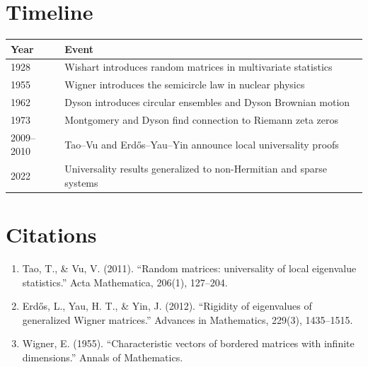 \section{Timeline}

\begin{tabularx}{\linewidth}{lX}
\toprule
\textbf{Year} & \textbf{Event} \\ \midrule
1928 & Wishart introduces random matrices in multivariate statistics \\ 
1955 & Wigner introduces the semicircle law in nuclear physics \\ 
1962 & Dyson introduces circular ensembles and Dyson Brownian motion \\ 
1973 & Montgomery and Dyson find connection to Riemann zeta zeros \\ 
2009--2010 & Tao--Vu and Erdős--Yau--Yin announce local universality proofs \cite{taovu2011, erdos2012} \\ 
2022 & Universality results generalized to non-Hermitian and sparse systems \\ \bottomrule
\end{tabularx}

\section{Citations}

\begin{enumerate}
\item Tao, T., \& Vu, V. (2011). ``Random matrices: universality of local eigenvalue statistics.'' Acta Mathematica, 206(1), 127--204.
\item Erdős, L., Yau, H. T., \& Yin, J. (2012). ``Rigidity of eigenvalues of generalized Wigner matrices.'' Advances in Mathematics, 229(3), 1435--1515.
\item Wigner, E. (1955). ``Characteristic vectors of bordered matrices with infinite dimensions.'' Annals of Mathematics.
\end{enumerate}
